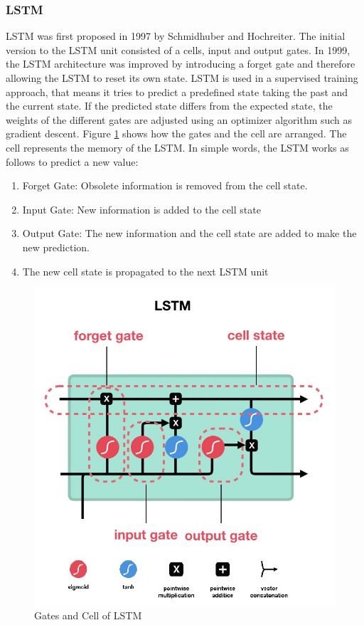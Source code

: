 \subsubsection{LSTM}
LSTM was first proposed in 1997 by Schmidhuber and Hochreiter. The initial version to the LSTM unit consisted of a cells, input and output gates. In 1999, the LSTM architecture was improved by introducing a forget gate and therefore allowing the LSTM to reset its own state. LSTM is used in a supervised training approach, that means it tries to predict a predefined state taking the past and the current state. If the predicted state differs from the expected state, the weights of the different gates are adjusted using an optimizer algorithm such as gradient descent. Figure \ref{fig:LSTM} shows how the gates and the cell are arranged. The cell represents the memory of the LSTM. In simple words, the LSTM works as follows to predict a new value: 

\begin{enumerate}
	\item Forget Gate: Obsolete information is removed from the cell state.
	\item Input Gate: New information is added to the cell state
	\item Output Gate: The new information and the cell state are added to make the new prediction.
	\item The new cell state is propagated to the next LSTM unit  
\end{enumerate}
     
\begin{figure}
	\centering
	\includegraphics[scale=0.5]{Figures/LSTM}
	\decoRule
	\caption[LSTM]{Gates and Cell of LSTM}
	\label{fig:LSTM}
\end{figure}


